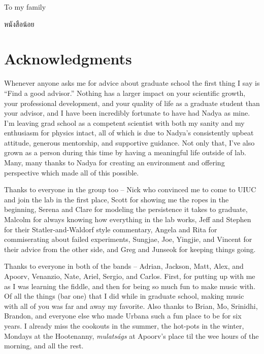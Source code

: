 \documentclass[edeposit,fullpage,draftthesis]{uiucthesis2009}
\begin{document}
\begin{dedication}
To my family

\foreignlanguage{thai}{\textthai{หนังสือน้อย}}

\end{dedication}

\chapter*{Acknowledgments}

Whenever anyone asks me for advice about graduate school the first thing
I say is ``Find a good advisor.'' Nothing has a larger impact on your scientific growth, 
your professional development, and your quality
of life as a graduate student than your advisor, and I have been incredibly fortunate
to have had Nadya as mine. I'm leaving grad school as a competent scientist with both my sanity and my enthusiasm
for physics intact, all of which is due to Nadya's consistently upbeat attitude, generous mentorship,
and supportive guidance. 
Not only that, I've also grown as a person
during this time by having a meaningful life outside of lab.
Many, many thanks to Nadya for creating an environment and offering perspective 
which made all of this possible.


Thanks to everyone in the group too -- Nick who convinced me to come to UIUC and join
the lab in the first place, Scott for showing me the ropes in the beginning, Serena and Clare 
for modeling the persistence it takes to graduate, Malcolm for always knowing how
everything in the lab works, Jeff and Stephen for their Statler-and-Waldorf style commentary, 
Angela and Rita for commiserating about failed experiments, Sungjae, Joe, Yingjie,
and Vincent for their advice from the other side, and Greg and Junseok for keeping things going.

Thanks to everyone in both of the bands -- Adrian, Jackson, Matt, Alex, and Apoorv,
Venanzio, Nate, Ariel, Sergio, and Carlos. First, for putting up with me as I
was learning the fiddle, and then for being so much fun to make music with.
Of all the things (bar one) that I did while in graduate school, making music
with all of you was far and away my favorite. Also thanks to Brian, Mo, Srinidhi, Brandon,
and everyone else who made Urbana such a fun place to be for six years. I already miss the
cookouts in the summer, the hot-pots in the winter,
Mondays at the Hootenanny, \textit{mulats\'{a}gs} at Apoorv's place til the wee hours of the morning,
and all the rest.
\end{document}
